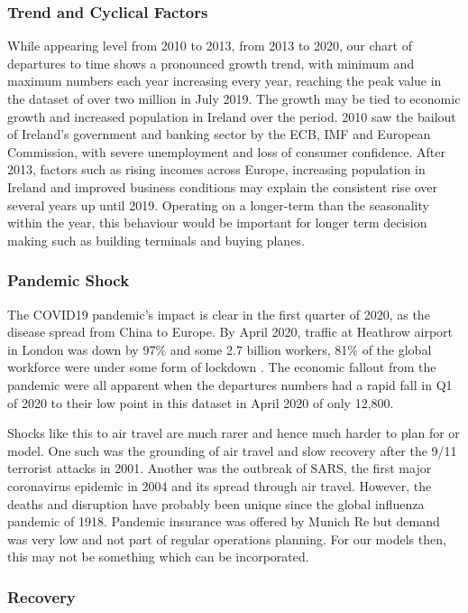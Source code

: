 \documentclass[9pt,technote]{IEEEtran}
\begin{document}
\subsubsection{Trend and Cyclical Factors} While appearing level from 2010 to 2013, from 2013 to 2020, our chart of departures to time shows a pronounced growth trend, with minimum and maximum numbers each year increasing every year, reaching the peak value in the dataset of over two million in July 2019.  The growth may be tied to economic growth and increased population in Ireland over the period.   2010 saw the bailout of Ireland's government and banking sector by the ECB, IMF and European Commission, with severe unemployment and loss of consumer confidence.  After 2013, factors such as rising incomes across Europe, increasing population in Ireland and improved business conditions may explain the consistent rise over several years up until 2019.  Operating on a longer-term than the seasonality within the year, this behaviour would be important for longer term decision making such as building terminals and buying planes.  

\subsubsection{Pandemic Shock}
The COVID19 pandemic's impact is clear in the first quarter of 2020, as the disease spread from China to Europe.  By April 2020, traffic at Heathrow airport in London was down by 97\% and some 2.7 billion workers, 81\% of the global workforce were under some form of lockdown \cite{tooze21}.  The economic fallout from the pandemic were all apparent when the departures numbers had a rapid fall in Q1 of 2020 to their low point in this dataset in April 2020 of only 12,800.  

Shocks like this to air travel are much rarer and hence much harder to plan for or model.   One such was the grounding of air travel and slow recovery after the 9/11 terrorist attacks in 2001.  Another was the outbreak of SARS, the first major coronavirus epidemic in 2004 and its spread through air travel\cite{greenfeld06}.  However, the deaths and disruption have probably been unique since the global influenza pandemic of 1918.  Pandemic insurance was offered by Munich Re but demand was very low and not part of regular operations planning. For our models then, this may not be something which can be incorporated.  

\subsubsection{Recovery}
\end{document}
